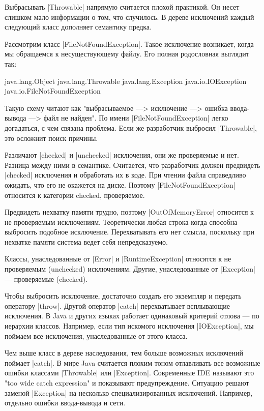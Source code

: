 Выбрасывать \spverb|Throwable| напрямую считается плохой практикой. Он несет слишком
мало информации о том, что случилось. В дереве исключений каждый следующий класс
дополняет семантику предка.

Рассмотрим класс \spverb|FileNotFoundException|. Такое исключение возникает, когда мы
обращаемся к несуществующему файлу. Его полная родословная выглядит так:

\begin{code}
java.lang.Object
  java.lang.Throwable
    java.lang.Exception
      java.io.IOException
        java.io.FileNotFoundException
\end{code}

Такую схему читают как "выбрасываемое —> исключение —> ошибка ввода-вывода —>
файл не найден". По имени \spverb|FileNotFoundException| легко догадаться, с чем
связана проблема. Если же разработчик выбросил \spverb|Throwable|, это осложнит поиск
причины.

Различают \spverb|checked| и \spverb|unchecked| исключения, они же проверяемые и нет. Разница
между ними в семантике. Считается, что разработчик должен предвидеть \spverb|checked|
исключения и обработать их в коде. При чтении файла справедливо ожидать, что его
не окажется на диске. Поэтому \spverb|FileNotFoundException| относится к категории
checked, проверяемое.

Предвидеть нехватку памяти трудно, поэтому \spverb|OutOfMemoryError| относится к не
проверяемым исключениям. Теоретически любая строка когда способна выбросить
подобное исключение. Перехватывать его нет смысла, поскольку при нехватке памяти
система ведет себя непредсказуемо.

Классы, унаследованные от \spverb|Error| и \spverb|RuntimeException| относятся к не проверяемым
(unchecked) исключениям. Другие, унаследованные от \spverb|Exception| — проверяемые
(checked).

Чтобы выбросить исключение, достаточно создать его экземпляр и передать
оператору \spverb|throw|. Другой оператор \spverb|catch| перехватывает всплывающие
исключения. В Java и других языках работает одинаковый критерий отлова — по
иерархии классов. Например, если тип искомого исключения \spverb|IOException|, мы
поймаем все исключения, унаследованные от этого класса.

Чем выше класс в дереве наследования, тем больше возможных исключений поймает
\spverb|catch|. В мире Java считается плохим тоном отлавливать все возможные ошибки
классами \spverb|Throwable| или \spverb|Exception|. Современные IDE называют это "too wide
catch expression" и показывают предупреждение. Ситуацию решают заменой
\spverb|Exception| на несколько специализированных исключений. Например, отдельно
ошибки ввода-вывода и сети.

